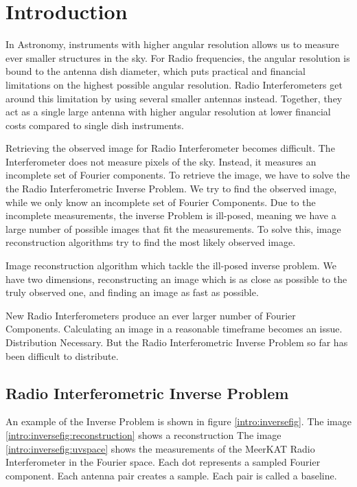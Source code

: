 \section{Introduction}\label{intro}
In Astronomy, instruments with higher angular resolution allows us to measure ever smaller structures in the sky. For Radio frequencies, the angular resolution is bound to the antenna dish diameter, which puts practical and financial limitations on the highest possible angular resolution. Radio Interferometers get around this limitation by using several smaller antennas instead. Together, they act as a single large antenna with higher angular resolution at lower financial costs compared to single dish instruments.

Retrieving the observed image for Radio Interferometer becomes difficult. The Interferometer does not measure pixels of the sky. Instead, it measures an incomplete set of Fourier components. To retrieve the image, we have to solve the the Radio Interferometric Inverse Problem. We try to find the observed image, while we only know an incomplete set of Fourier Components. Due to the incomplete measurements, the inverse Problem is ill-posed, meaning we have a large number of possible images that fit the measurements. To solve this, image reconstruction algorithms try to find the most likely observed image.

Image reconstruction algorithm which tackle the ill-posed inverse problem. We have two dimensions, reconstructing an image which is as close as possible to the truly observed one, and finding an image as fast as possible.

New Radio Interferometers produce an ever larger number of Fourier Components. Calculating an image in a reasonable timeframe becomes an issue. Distribution Necessary. But the Radio Interferometric Inverse Problem so far has been difficult to distribute.


\subsection{Radio Interferometric Inverse Problem}
An example of the Inverse Problem is shown in figure \ref{intro:inversefig}. The image \ref{intro:inversefig:reconstruction} shows a reconstruction The image \ref{intro:inversefig:uvspace} shows the measurements of the MeerKAT Radio Interferometer in the Fourier space. Each dot represents a sampled Fourier component. Each antenna pair creates a sample. Each pair is called a baseline. 

